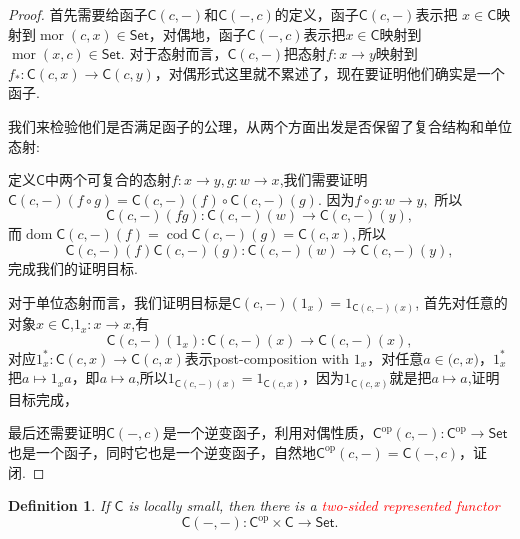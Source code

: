 \documentclass{article}
\newtheorem{definition}[theorem]{Definition}
\newcommand*{\cat}[1]{\textsf{#1}\xspace}
\newcommand{\Set}{\textsf{Set}\xspace}
\newcommand{\op}{\textrm{op}}
\newcommand*{\xfunc}[4]{{#2}\colon{#3}{#1}{#4}}
\newcommand*{\func}[3]{\xfunc{\to}{#1}{#2}{#3}}
\DeclareMathOperator{\mor}{mor}
\DeclareMathOperator{\dom}{dom}
\DeclareMathOperator{\cod}{cod}
\newcommand{\redt}[1]{\textcolor{red}{#1}}
\begin{document}
\begin{proof}
首先需要给函子$\cat{C}(c,-)$和$\cat{C}(-,c)$的定义，函子$\cat{C}(c,-)$表示把
$x \in \cat{C}$映射到$\mor(c,x) \in \cat{Set}$，对偶地，函子$\cat{C}(-,c)$表示把$x \in \cat{C}$映射到$\mor(x,c) \in \cat{Set}$. 对于态射而言，$\cat{C}(c,-)$把态射$\func{f}{x}{y}$映射到$\func{f_*}{\cat{C}(c,x)}{\cat{C}(c,y)}$，对偶形式这里就不累述了，现在要证明他们确实是一个函子. 

我们来检验他们是否满足函子的公理，从两个方面出发是否保留了复合结构和单位态射:

定义$\cat{C}$中两个可复合的态射$\func{f}{x}{y},\func{g}{w}{x}$,我们需要证明$\cat{C}(c,-)(f \circ g)=\cat{C}(c,-)(f) \circ \cat{C}(c,-)(g)$. 因为$\func{f \circ g}{w}{y},$ 所以\[\func{\cat{C}(c,-)(fg)}{\cat{C}(c,-)(w)}{\cat{C}(c,-)(y)},\]而$\dom\cat{C}(c,-)(f)=\cod\cat{C}(c,-)(g)=\cat{C}(c,x),$所以\[\func{\cat{C}(c,-)(f)\cat{C}(c,-)(g)}{\cat{C}(c,-)(w)}{\cat{C}(c,-)(y)},\]完成我们的证明目标.

对于单位态射而言，我们证明目标是$\cat{C}(c,-)(1_x)=1_{\cat{C}(c,-)(x)}$, 首先对任意的对象$x\in\cat{C}$,$\func{1_x}{x}{x}$,有\[\func{\cat{C}(c,-)(1_x)}{\cat{C}(c,-)(x)}{\cat{C}(c,-)(x)},\]对应$\func{1^{*}_{x}}{\cat{C}(c,x)}{\cat{C}(c,x)}$表示post-composition with $1_x$，对任意$a\in\cat(c,x)$，$1^{*}_{x}$把$a\mapsto 1_xa$，即$a \mapsto a$,所以$1_{\cat{C}(c,-)(x)} = 1_{\cat{C}(c,x)}$，因为$1_{\cat{C}(c,x)}$就是把$a \mapsto a$,证明目标完成，

最后还需要证明$\cat{C}(-,c)$是一个逆变函子，利用对偶性质，$\func{\cat{C}^\op(c,-)}{\cat{C}^\op}{\Set}$也是一个函子，同时它也是一个逆变函子，自然地$\cat{C}^\op(c,-) = \cat{C}(-,c)$，证闭. 
\end{proof}

\begin{definition}
\rm If $\cat{C}$ is locally small, then there is a \redt{two-sided represented functor}
$$
\cat{C}(-,-):\cat{C}^\op \times \cat{C} \to \Set. 
$$
\end{definition}
\end{document}
